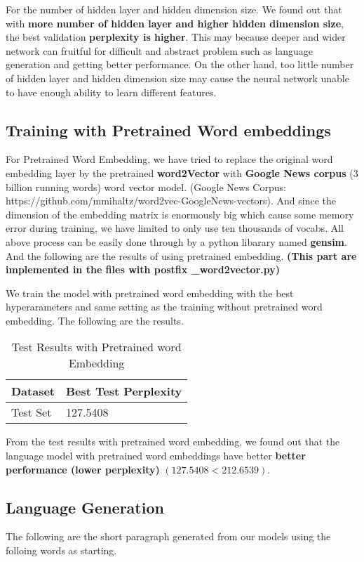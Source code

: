 \documentclass{article}
\begin{document}
For the number of hidden layer and hidden dimension size. We found out that with \textbf{more number of hidden layer and higher hidden dimension size}, the best validation \textbf{perplexity is higher}. This may because deeper and wider network can fruitful for difficult and abstract problem such as language generation and getting better performance. On the other hand, too little number of hidden layer and hidden dimension size may cause the neural network unable to have enough ability to learn different features.

\subsection{Training with Pretrained Word embeddings}
For Pretrained Word Embedding, we have tried to replace the original word embedding layer by the pretrained \textbf{word2Vector} with \textbf{Google News corpus} (3 billion running words) word vector model. (Google News Corpus: https://github.com/mmihaltz/word2vec-GoogleNews-vectors). And since the dimension of the embedding matrix is enormously big which cause some memory error during training, we have limited to only use ten thousands of vocabs. All above process can be easily done through by a python libarary named \textbf{gensim}. And the following are the results of using pretrained embedding. \textbf{(This part are implemented in the files with postfix \_word2vector.py)}

We train the model with pretrained word embedding with the best hyperarameters and same setting as the training without pretrained word embedding. The following are the results.

\begin{table}[htb]
	\caption{Test Results with Pretrained word Embedding}
	\label{sample-table}
	\centering
	\begin{tabular}{ll}
		\toprule
		\cmidrule{1-2}
		Dataset & Best Test Perplexity\\
		\midrule
		Test Set & 127.5408   \\
		\bottomrule
	\end{tabular}
\end{table}

From the test results with pretrained word embedding, we found out that the language model with pretrained word embeddings have better \textbf{better performance (lower perplexity)} $(127.5408 < 212.6539)$. 

\subsection{Language Generation}
The following are the short paragraph generated from our models using the folloing words as starting.
\end{document}
